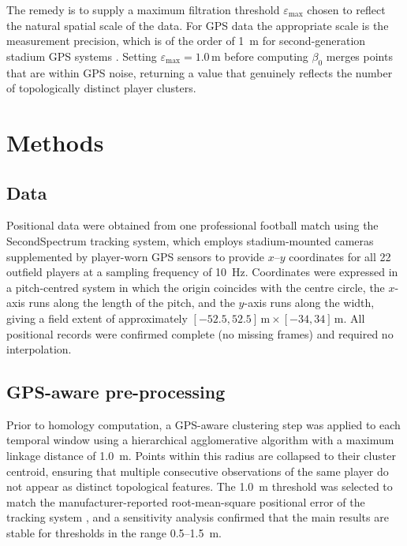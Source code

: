 \documentclass[11pt,a4paper]{article}
\begin{document}
The remedy is to supply a maximum filtration threshold
\(\varepsilon_{\max}\) chosen to reflect the natural spatial
scale of the data.  For GPS data the appropriate scale is
the measurement precision, which is of the order of 1~m for
second-generation stadium GPS systems \citep{Cummins2013}.
Setting \(\varepsilon_{\max} = 1.0\,\text{m}\) before
computing \(\beta_0\) merges points that are within GPS
noise, returning a value that genuinely reflects
the number of topologically distinct player clusters.

\section{Methods}
\label{sec:methods}

\subsection{Data}
\label{sec:data}

Positional data were obtained from one professional football
match using the SecondSpectrum tracking system, which
employs stadium-mounted cameras supplemented by
player-worn GPS sensors to provide \(x\)--\(y\) coordinates
for all 22 outfield players at a sampling frequency of
10~Hz.  Coordinates were expressed in a pitch-centred
system in which the origin coincides with the centre
circle, the \(x\)-axis runs along the length of the pitch,
and the \(y\)-axis runs along the width, giving a field
extent of approximately
\([-52.5, 52.5]\,\text{m} \times [-34, 34]\,\text{m}\).
All positional records were confirmed complete (no missing
frames) and required no interpolation.

\subsection{GPS-aware pre-processing}
\label{sec:preprocess}

Prior to homology computation, a GPS-aware clustering step
was applied to each temporal window using a hierarchical
agglomerative algorithm with a maximum linkage distance of
1.0~m.  Points within this radius are collapsed to their
cluster centroid, ensuring that multiple consecutive
observations of the same player do not appear as distinct
topological features.  The 1.0~m threshold was selected to
match the manufacturer-reported root-mean-square positional
error of the tracking system \citep{Cummins2013}, and a
sensitivity analysis confirmed that the main results are
stable for thresholds in the range 0.5--1.5~m.
\end{document}
